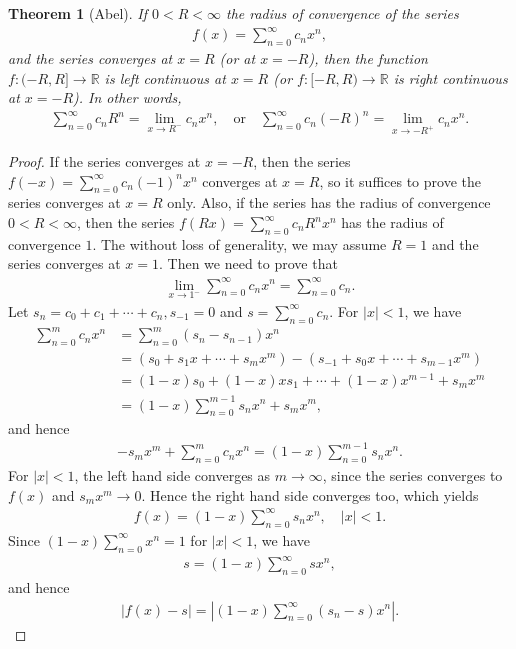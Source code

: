 \documentclass[11pt]{book}
\newtheorem{theorem}{Theorem}[chapter]
\theoremstyle{definition}
\numberwithin{equation}{chapter}
\begin{document}
\medskip

\begin{theorem}[Abel]\label{th_626}
If $0 < R < \infty$ the radius of convergence of the series
\begin{align*}
    f(x) = \sum^\infty_{n=0} c_n x^n,
\end{align*}
and the series converges at $x = R$ (or at $x = -R$), then the function $f:(-R,R] \to \mathbb{R}$ is left continuous at $x = R$ (or $f:[-R,R) \to \mathbb{R}$ is right continuous at $x = -R$). In other words,
\begin{align*}
    \sum^\infty_{n=0} c_n R^n = \lim_{x \to R^-} c_n x^n, \quad \text{or} \quad \sum^\infty_{n=0} c_n (-R)^n = \lim_{x \to -R^+} c_n x^n.
\end{align*}
\end{theorem}
\begin{proof}
If the series converges at $x = -R$, then the series $f(-x) = \sum^\infty_{n=0} c_n (-1)^n x^n$ converges at $x = R$, so it suffices to prove the series converges at $x = R$ only. Also, if the series has the radius of convergence $0 < R < \infty$, then the series $f(Rx) = \sum^\infty_{n=0} c_n R^n x^n$ has the radius of convergence $1$. The without loss of generality, we may assume $R = 1$ and the series converges at $x = 1$. Then we need to prove that
\begin{align}\label{th_626_equ1}
    \lim_{x \to 1^-} \sum^\infty_{n=0} c_n x^n = \sum^\infty_{n=0} c_n.
\end{align}
Let $s_n = c_0 + c_1 + \cdots + c_n, s_{-1} = 0$ and $s = \sum^\infty_{n=0} c_n$. For $\left|x\right| < 1$, we have
\begin{align*}
    \sum^m_{n=0} c_n x^n & = \sum^m_{n=0} \left(s_n - s_{n-1}\right) x^n \\
    & = \left(s_0 + s_1 x + \cdots + s_m x^m\right) - \left(s_{-1} + s_0 x + \cdots + s_{m-1}x^m\right) \\
    & = (1 - x) s_0 + (1 - x)xs_1 + \cdots + (1 - x)x^{m-1} + s_m x^m \\
    & = (1 - x) \sum^{m-1}_{n=0} s_n x^n + s_m x^m,
\end{align*}
and hence
\begin{align*}
    - s_m x^m + \sum^m_{n=0} c_n x^n = (1 - x) \sum^{m-1}_{n=0} s_n x^n.
\end{align*}
For $\left|x\right| < 1$, the left hand side converges as $m \to \infty$, since the series converges to $f(x)$ and $s_m x^m \to 0$. Hence the right hand side converges too, which yields
\begin{align*}
    f(x) = (1 - x) \sum^{\infty}_{n=0} s_n x^n, \quad \left|x\right| < 1.
\end{align*}
Since $(1 - x) \sum^\infty_{n=0} x^n = 1$ for $\left|x\right| < 1$, we have
\begin{align*}
    s = (1 - x) \sum^\infty_{n=0} s x^n,
\end{align*}
and hence
\begin{align*}
    \left|f(x) - s\right| = \left|(1 - x) \sum^{\infty}_{n=0} (s_n - s) x^n\right|.
\end{align*}


\end{proof}
\end{document}
